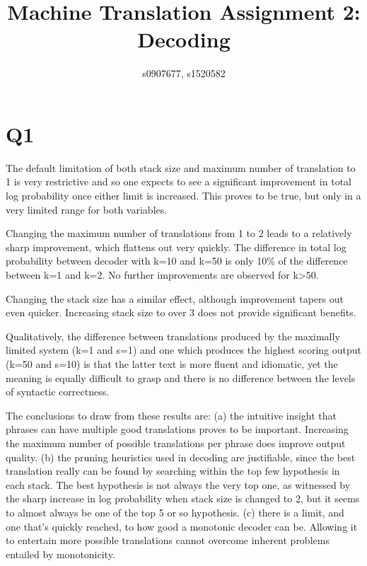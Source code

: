 \documentclass[11pt]{article}
\title{Machine Translation Assignment 2: Decoding} %
\author{s0907677, s1520582} %
\date{}
\begin{document}
\maketitle %

\section*{Q1}
The default limitation of both stack size and maximum number of translation to 1 is very restrictive and so one expects to see a significant improvement in total log probability once either limit is increased. This proves to be true, but only in a very limited range for both variables.

Changing the maximum number of translations from 1 to 2 leads to a relatively sharp improvement, which flattens out very quickly. The difference in total log probability between decoder with k=10 and k=50 is only 10\% of the difference between k=1 and k=2. No further improvements are observed for k>50.

Changing the stack size has a similar effect, although improvement tapers out even quicker. Increasing stack size to over 3 does not provide significant benefits.

Qualitatively, the difference between translations produced by the maximally limited system (k=1 and s=1) and one which produces the highest scoring output (k=50 and s=10) is that the latter text is more fluent and idiomatic,  yet the meaning is equally difficult to grasp and there is no difference between the levels of syntactic correctness.

The conclusions to draw from these results are:
(a) the intuitive insight that phrases can have multiple good translations proves to be important. Increasing the maximum number of possible translations per phrase does improve output quality.
(b) the pruning heuristics used in decoding are justifiable, since the best translation really can be found by searching within the top few hypothesis in each stack. The best hypothesis is not always the very top one, as witnessed by the sharp increase in log probability when stack size is changed to 2, but it seems to almost always be one of the top 5 or so hypothesis.
(c) there is a limit, and one that's quickly reached, to how good a monotonic decoder can be. Allowing it to entertain more possible translations cannot overcome inherent problems entailed by monotonicity.
\end{document}
